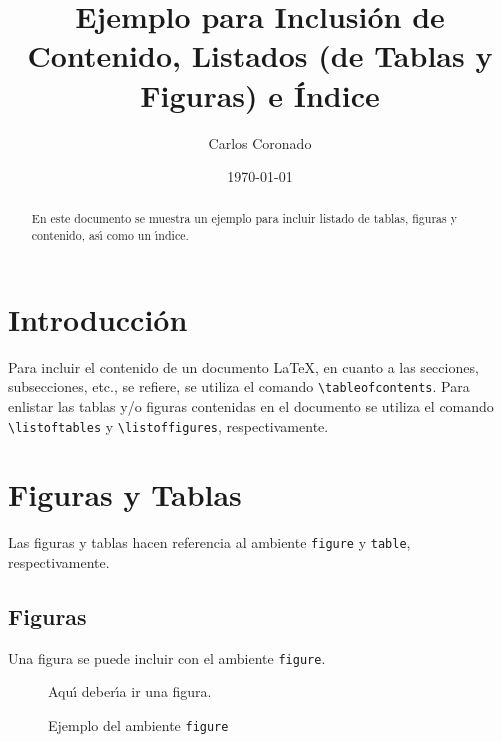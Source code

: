 \documentclass{article}            %
\author{Carlos Coronado}
\title{Ejemplo para Inclusi\'on de Contenido, Listados (de Tablas y Figuras) 
e \'Indice}
\date{\today}
\begin{document}

\maketitle                         %

\tableofcontents         %
\listoffigures           %
\listoftables            %

\begin{abstract}                   %

  En este documento se muestra un ejemplo para incluir listado de
  tablas, figuras y contenido, as\'{\i} como un \'{\i}ndice.

\end{abstract}

\section{Introducci\'on}

  Para incluir el contenido de un documento \LaTeX, en cuanto a las
  secciones, subsecciones, etc., se refiere, se utiliza el comando
  \verb|\tableofcontents|.  Para enlistar las tablas y/o figuras
  contenidas en el documento se utiliza el comando
  \verb|\listoftables| y \verb|\listoffigures|, respectivamente.

\section{Figuras y Tablas}

  Las figuras y tablas hacen referencia al
  ambiente \texttt{figure} y \texttt{table}, respectivamente.

\subsection{Figuras}

  Una figura se puede incluir con el ambiente \texttt{figure}.

  \begin{figure}

   Aqu\'{\i} deber\'{\i}a ir una figura.

  \caption{Ejemplo del ambiente \texttt{figure}}\label{fig:ejemplo}


  \end{figure}
\end{document}
